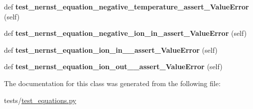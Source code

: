 \begin{DoxyCompactItemize}
\mbox{\label{classtest__equations_1_1TestNernstEquation_ac7585e917e73ea2e5879851bab850717}} 
def {\bfseries test\+\_\+nernst\+\_\+equation\+\_\+negative\+\_\+temperature\+\_\+assert\+\_\+\+Value\+Error} (self)
\item 
\mbox{\label{classtest__equations_1_1TestNernstEquation_a17e597496ca50097572c04a256a477cf}} 
def {\bfseries test\+\_\+nernst\+\_\+equation\+\_\+negative\+\_\+ion\+\_\+in\+\_\+assert\+\_\+\+Value\+Error} (self)
\item 
\mbox{\label{classtest__equations_1_1TestNernstEquation_a9ff8a7d0f52e51e4b87f747e2e4943ee}} 
def {\bfseries test\+\_\+nernst\+\_\+equation\+\_\+ion\+\_\+in\+\_\+\_\+assert\+\_\+\+Value\+Error} (self)
\item 
\mbox{\label{classtest__equations_1_1TestNernstEquation_a71bf52a7d262580e6839830545400624}} 
def {\bfseries test\+\_\+nernst\+\_\+equation\+\_\+ion\+\_\+out\+\_\+\_\+assert\+\_\+\+Value\+Error} (self)
\end{DoxyCompactItemize}


The documentation for this class was generated from the following file\+:\begin{DoxyCompactItemize}
\item 
tests/\hyperlink{test__equations_8py}{test\+\_\+equations.\+py}\end{DoxyCompactItemize}
